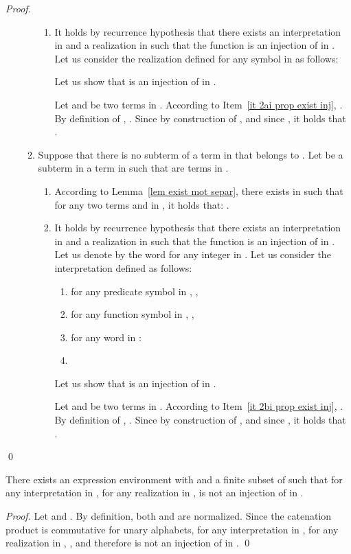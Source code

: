 \documentclass[a4paper]{llncs}
\begin{document}
\begin{proof}
\begin{enumerate}
\begin{enumerate}
\begin{enumerate}
        \item It holds by recurrence hypothesis that there exists  an interpretation in  and  a realization in  such that the function  is an injection of  in . Let us consider the realization  defined for any symbol  in  as follows:
        
    Let us show that  is an injection of  in . 
    
    Let  and  be two terms in . According to Item~\ref{it 2ai prop exist inj}, . By definition of , . Since by construction of ,  and since , it holds that .
    \end{enumerate}
    \item Suppose that there is no subterm of a term in  that belongs to . Let  be a subterm in a term in  such that  are  terms in .  
    
    \begin{enumerate}
      \item\label{it 2bi prop exist inj} According to Lemma~\ref{lem exist mot separ}, there exists  in  such that for any two terms  and  in , it holds that: . 
        
      \item It holds by recurrence hypothesis that there exists  an interpretation in  and  a realization in  such that the function  is an injection of  in . 
    Let us denote by  the word  for any integer  in .
    Let us consider the interpretation  defined as follows:
    \begin{enumerate}
      \item for any predicate symbol  in , ,
      \item for any function symbol  in , ,
      \item for any  word  in :
            
    \item 
  \end{enumerate}
    
    Let us show that  is an injection of  in . 
    
        Let  and  be two terms in . According to Item~\ref{it 2bi prop exist inj}, . By definition of , . Since by construction of ,  and since , it holds that .
        \end{enumerate}
        \end{enumerate}
    \end{enumerate}
    \qed
  \end{proof} 
  
  
  
  \begin{proposition}
  There exists an expression environment  with  and a finite subset  of  such that for any interpretation  in , for any realization  in ,  is not an injection of  in .
  \end{proposition}
  \begin{proof}
    Let  and .
    By definition, both  and  are normalized.
    Since the catenation product is commutative for unary alphabets, for any interpretation  in , for any realization  in , , and therefore  is not an injection of  in .
  \qed
  \end{proof}
  
\end{document}
